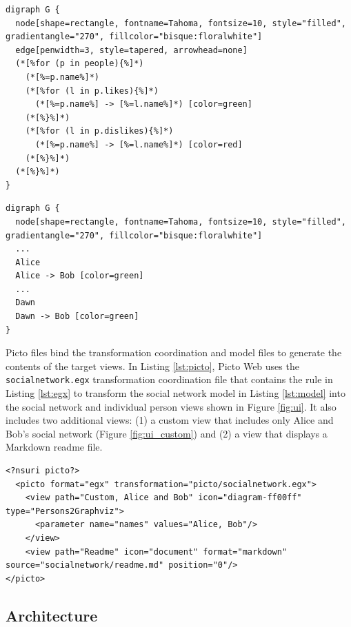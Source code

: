 \documentclass[sigconf,review]{acmart}
\begin{document}
\begin{lstlisting}[firstnumber=1,style=egx,caption={An EGL template that generates a Graphviz representation of a social network.},label=lst:egl,float]
digraph G {
  node[shape=rectangle, fontname=Tahoma, fontsize=10, style="filled", gradientangle="270", fillcolor="bisque:floralwhite"]
  edge[penwidth=3, style=tapered, arrowhead=none]
  (*[%for (p in people){%]*)
    (*[%=p.name%]*)
    (*[%for (l in p.likes){%]*)
      (*[%=p.name%] -> [%=l.name%]*) [color=green]
    (*[%}%]*)
    (*[%for (l in p.dislikes){%]*)
      (*[%=p.name%] -> [%=l.name%]*) [color=red]
    (*[%}%]*)
  (*[%}%]*)
}
\end{lstlisting}

\begin{lstlisting}[firstnumber=1,style=egx,caption={A view generated by the EGL template in Listing \ref{lst:egl}.},label=lst:output,float]
digraph G {
  node[shape=rectangle, fontname=Tahoma, fontsize=10, style="filled", gradientangle="270", fillcolor="bisque:floralwhite"]
  ...
  Alice
  Alice -> Bob [color=green]
  ...
  Dawn
  Dawn -> Bob [color=green] 
}
\end{lstlisting}

Picto files bind the transformation coordination and model files to generate the contents of the target views. In Listing \ref{lst:picto}, Picto Web uses the \texttt{socialnetwork.egx} transformation coordination file that contains the rule in Listing \ref{lst:egx} to transform the social network model in Listing \ref{lst:model} into the social network and individual person views shown in Figure \ref{fig:ui}. It also includes two additional views: (1) a custom view that includes only Alice and Bob's social network (Figure \ref{fig:ui_custom}) and (2) a view that displays a Markdown readme file.

\begin{lstlisting}[firstnumber=1,style=picto,caption={The Picto file that binds the model and the visualisation transformation.},label=lst:picto,float]
<?nsuri picto?>
  <picto format="egx" transformation="picto/socialnetwork.egx">
    <view path="Custom, Alice and Bob" icon="diagram-ff00ff" type="Persons2Graphviz">
      <parameter name="names" values="Alice, Bob"/>
    </view>        
    <view path="Readme" icon="document" format="markdown" source="socialnetwork/readme.md" position="0"/>
</picto>
\end{lstlisting}


\subsection{Architecture}
\label{sec:architecture}
\end{document}
